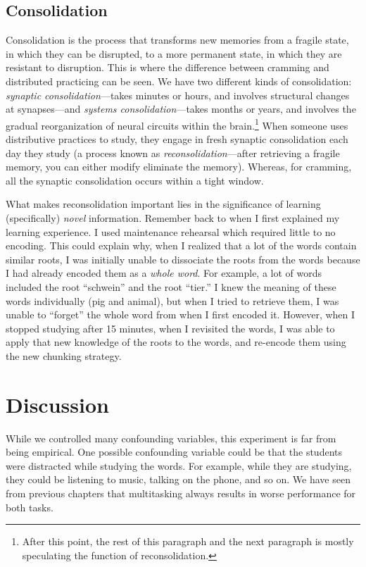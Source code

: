 \documentclass[stu,12pt,floatsintext]{apa7}
\begin{document}
\hypertarget{consolidation}{}
\subsection{Consolidation}

Consolidation is the process that transforms new memories from a fragile state, in which they can be disrupted, to a more permanent state, in which they are resistant to disruption. This is where the difference between cramming and distributed practicing can be seen. We have two different kinds of consolidation: \textit{synaptic consolidation}---takes minutes or hours, and involves structural changes at synapses---and \textit{systems consolidation}---takes months or years, and involves the gradual reorganization of neural circuits within the brain.\footnote{After this point, the rest of this paragraph and the next paragraph is mostly speculating the function of reconsolidation.} When someone uses distributive practices to study, they engage in fresh synaptic consolidation each day they study (a process known as \textit{reconsolidation}---after retrieving a fragile memory, you can either modify eliminate the memory). Whereas, for cramming, all the synaptic consolidation occurs within a tight window. 

What makes reconsolidation important lies in the significance of learning (specifically) \textit{novel} information. Remember back to when I first explained my learning experience. I used maintenance rehearsal which required little to no encoding. This could explain why, when I realized that a lot of the words contain similar roots, I was initially unable to dissociate the roots from the words because I had already encoded them as a \textit{whole word}. For example, a lot of words included the root ``schwein'' and the root ``tier.'' I knew the meaning of these words individually (pig and animal), but when I tried to retrieve them, I was unable to ``forget'' the whole word from when I first encoded it. However, when I stopped studying after 15 minutes, when I revisited the words, I was able to apply that new knowledge of the roots to the words, and re-encode them using the new chunking strategy.

\section{Discussion}

While we controlled many confounding variables, this experiment is far from being empirical. One possible confounding variable could be that the students were distracted while studying the words. For example, while they are studying, they could be listening to music, talking on the phone, and so on. We have seen from previous chapters that multitasking always results in worse performance for both tasks.  
\end{document}
